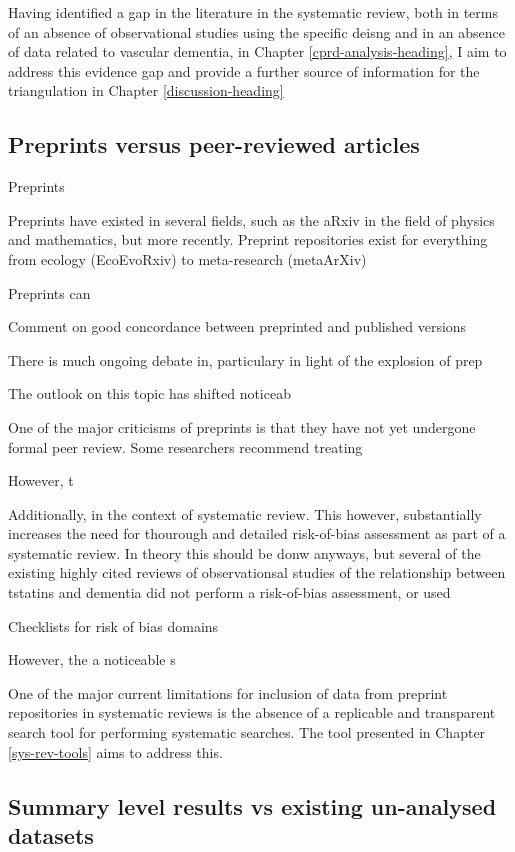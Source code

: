 \documentclass[a4paper, twoside]{templates/ociamthesis}
\begin{document}
Having identified a gap in the literature in the systematic review, both in terms of an absence of observational studies using the specific deisng and in an absence of data related to vascular dementia, in Chapter \ref{cprd-analysis-heading}, I aim to address this evidence gap and provide a further source of information for the triangulation in Chapter \ref{discussion-heading}

\hypertarget{preprints-versus-peer-reviewed-articles}{%
\subsection{Preprints versus peer-reviewed articles}\label{preprints-versus-peer-reviewed-articles}}

Preprints

Preprints have existed in several fields, such as the aRxiv in the field of physics and mathematics, but more recently. Preprint repositories exist for everything from ecology (EcoEvoRxiv) to meta-research (metaArXiv)

Preprints can

Comment on good concordance between preprinted and published versions

There is much ongoing debate in, particulary in light of the explosion of prep

The outlook on this topic has shifted noticeab

One of the major criticisms of preprints is that they have not yet undergone formal peer review. Some researchers recommend treating

However, t

Additionally, in the context of systematic review. This however, substantially increases the need for thourough and detailed risk-of-bias assessment as part of a systematic review. In theory this should be donw anyways, but several of the existing highly cited reviews of observationsal studies of the relationship between tstatins and dementia did not perform a risk-of-bias assessment, or used

Checklists for risk of bias domains

However, the a noticeable s

One of the major current limitations for inclusion of data from preprint repositories in systematic reviews is the absence of a replicable and transparent search tool for performing systematic searches. The tool presented in Chapter \ref{sys-rev-tools} aims to address this.

\hypertarget{summary-level-results-vs-existing-un-analysed-datasets}{%
\subsection{Summary level results vs existing un-analysed datasets}\label{summary-level-results-vs-existing-un-analysed-datasets}}
\end{document}
